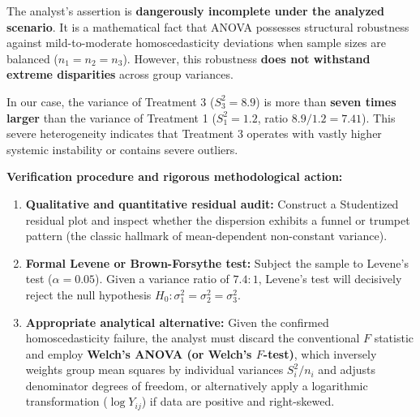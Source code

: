 \begin{solproblema}
	The analyst's assertion is \textbf{dangerously incomplete under the analyzed scenario}. It is a mathematical fact that ANOVA possesses structural robustness against mild-to-moderate homoscedasticity deviations when sample sizes are balanced ($n_1 = n_2 = n_3$). However, this robustness \textbf{does not withstand extreme disparities} across group variances.
	
	In our case, the variance of Treatment 3 ($S_3^2 = 8.9$) is more than \textbf{seven times larger} than the variance of Treatment 1 ($S_1^2 = 1.2$, ratio $8.9 / 1.2 = 7.41$). This severe heterogeneity indicates that Treatment 3 operates with vastly higher systemic instability or contains severe outliers.
	
	\textbf{Verification procedure and rigorous methodological action:}
	\begin{enumerate}
		\item \textbf{Qualitative and quantitative residual audit:} Construct a Studentized residual plot and inspect whether the dispersion exhibits a funnel or trumpet pattern (the classic hallmark of mean-dependent non-constant variance).
		\item \textbf{Formal Levene or Brown-Forsythe test:} Subject the sample to Levene's test ($\alpha = 0.05$). Given a variance ratio of $7.4:1$, Levene's test will decisively reject the null hypothesis $H_0: \sigma_1^2 = \sigma_2^2 = \sigma_3^2$.
		\item \textbf{Appropriate analytical alternative:} Given the confirmed homoscedasticity failure, the analyst must discard the conventional $F$ statistic and employ \textbf{Welch's ANOVA (or Welch's $F$-test)}, which inversely weights group mean squares by individual variances $S_i^2/n_i$ and adjusts denominator degrees of freedom, or alternatively apply a logarithmic transformation ($\log Y_{ij}$) if data are positive and right-skewed.
	\end{enumerate}
\end{solproblema}


